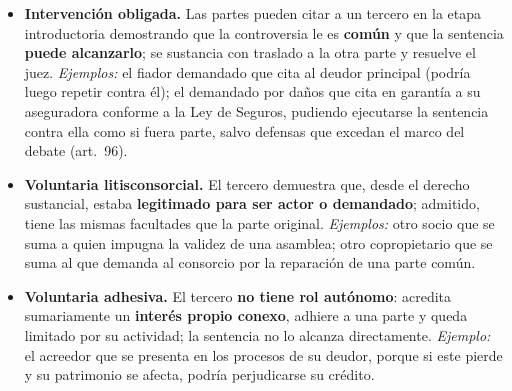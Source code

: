 \documentclass[12pt,oneside]{book}
\begin{document}
\begin{itemize}
\item \textbf{Intervención obligada.} Las partes pueden citar a un tercero en la etapa introductoria demostrando que la controversia le es \textbf{común} y que la sentencia \textbf{puede alcanzarlo}; se sustancia con traslado a la otra parte y resuelve el juez. \textit{Ejemplos:} el fiador demandado que cita al deudor principal (podría luego repetir contra él); el demandado por daños que cita en garantía a su aseguradora conforme a la Ley de Seguros, pudiendo ejecutarse la sentencia contra ella como si fuera parte, salvo defensas que excedan el marco del debate (art.~96).
\item \textbf{Voluntaria litisconsorcial.} El tercero demuestra que, desde el derecho sustancial, estaba \textbf{legitimado para ser actor o demandado}; admitido, tiene las mismas facultades que la parte original. \textit{Ejemplos:} otro socio que se suma a quien impugna la validez de una asamblea; otro copropietario que se suma al que demanda al consorcio por la reparación de una parte común.
\item \textbf{Voluntaria adhesiva.} El tercero \textbf{no tiene rol autónomo}: acredita sumariamente un \textbf{interés propio conexo}, adhiere a una parte y queda limitado por su actividad; la sentencia no lo alcanza directamente. \textit{Ejemplo:} el acreedor que se presenta en los procesos de su deudor, porque si este pierde y su patrimonio se afecta, podría perjudicarse su crédito.
\end{itemize}
\end{document}
